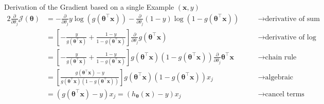 \begin{frame}{Derivation of the Gradient based on a single Example $(\bm{x}, y)$}{}\optional
	\footnotesize
	\begin{alignat*}{2}
		\frac{\partial}{\partial \theta_j} \mathcal{J}(\bm{\theta})
			&= 	-\frac{\partial}{\partial \theta_j} y \log(g(\bm{\theta}^{\intercal} \bm{x})) -
			     	\frac{\partial}{\partial \theta_j} (1 - y) \log(1 - g(\bm{\theta}^{\intercal} \bm{x}))
			&& 	\quad\longrightarrow \text{derivative of sum terms}			 						\\[2mm]
			&=	\left[ -\frac{y}{g(\bm{\theta}^{\intercal} \bm{x})} + \frac{1 - y}{1 - g(\bm{\theta}^{\intercal} \bm{x})} \right]
				\frac{\partial}{\partial \theta_j} g(\bm{\theta}^{\intercal} \bm{x})
			&& 	\quad\longrightarrow \text{derivative of log function} 									\\[2mm]
			&=	\left[ -\frac{y}{g(\bm{\theta}^{\intercal} \bm{x})} + \frac{1 - y}{1 - g(\bm{\theta}^{\intercal} \bm{x})} \right]
				g(\bm{\theta}^{\intercal} \bm{x}) (1 - g(\bm{\theta}^{\intercal} \bm{x}))
				\frac{\partial}{\partial \theta_j} \bm{\theta}^{\intercal} \bm{x}
			&& 	\quad\longrightarrow \text{chain rule} 											\\[2mm]
			&= 	\left[ \frac{g(\bm{\theta}^{\intercal} \bm{x}) - y}{g(\bm{\theta}^{\intercal} \bm{x}) (1 - g(\bm{\theta}^{\intercal} \bm{x}))} \right]
				g(\bm{\theta}^{\intercal} \bm{x}) (1 - g(\bm{\theta}^{\intercal} \bm{x})) x_j
			&& 	\quad\longrightarrow \text{algebraic manipulation} 									\\[2mm]
			&= 	(g(\bm{\theta}^{\intercal} \bm{x}) - y) x_j = \boxed{(h_{\bm{\theta}}(\bm{x}) - y) x_j}
			&& 	\quad\longrightarrow \text{cancel terms}
	\end{alignat*}
\end{frame}



